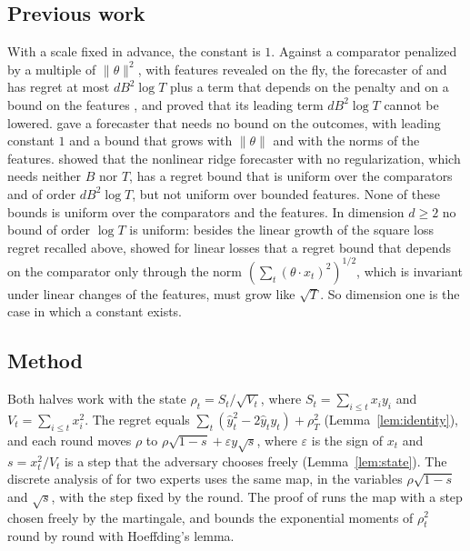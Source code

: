 \documentclass[12pt]{amsart}
\theoremstyle{definition}
\numberwithin{equation}{section}
\newcommand{\yh}{\hat y}
\begin{document}
\subsection*{Previous work}
With a scale fixed in advance, the constant is $1$. Against a comparator penalized by a multiple of $\|\theta\|^2$, with features revealed on the fly, the forecaster of \citet{Vovk01} and \citet{AW01} has regret at most $dB^2\log T$ plus a term that depends on the penalty and on a bound on the features \citetext{\citealp[Theorem~1]{Vovk01}; \citealp[Theorem~5.6]{AW01}}, and \citet[Theorem~2]{Vovk01} proved that its leading term $dB^2\log T$ cannot be lowered. \citet[Theorem~15]{MHvE} gave a forecaster that needs no bound on the outcomes, with leading constant $1$ and a bound that grows with $\|\theta\|$ and with the norms of the features. \citet[Theorem~11]{GaillardALT19} showed that the nonlinear ridge forecaster with no regularization, which needs neither $B$ nor $T$, has a regret bound that is uniform over the comparators and of order $dB^2\log T$, but not uniform over bounded features. None of these bounds is uniform over the comparators and the features. In dimension $d\ge2$ no bound of order $\log T$ is uniform: besides the linear growth of the square loss regret recalled above, \citet[Theorem~6]{Kot17} showed for linear losses that a regret bound that depends on the comparator only through the norm $(\sum_t(\theta\cdot x_t)^2)^{1/2}$, which is invariant under linear changes of the features, must grow like $\sqrt T$. So dimension one is the case in which a constant exists.

\subsection*{Method}
Both halves work with the state $\rho_t=S_t/\sqrt{V_t}$, where $S_t=\sum_{i\le t}x_iy_i$ and $V_t=\sum_{i\le t}x_i^2$. The regret equals $\sum_t(\yh_t^2-2\yh_ty_t)+\rho_T^2$ (Lemma~\ref{lem:identity}), and each round moves $\rho$ to $\rho\sqrt{1-s}+\varepsilon y\sqrt s$, where $\varepsilon$ is the sign of $x_t$ and $s=x_t^2/V_t$ is a step that the adversary chooses freely (Lemma~\ref{lem:state}). The discrete analysis of \citet[Section~3]{HLPR} for two experts uses the same map, in the variables $\rho\sqrt{1-s}$ and $\sqrt s$, with the step fixed by the round. The proof of \citet[Theorem~4]{CQRZ} runs the map with a step chosen freely by the martingale, and bounds the exponential moments of $\rho_t^2$ round by round with Hoeffding's lemma.
\end{document}
